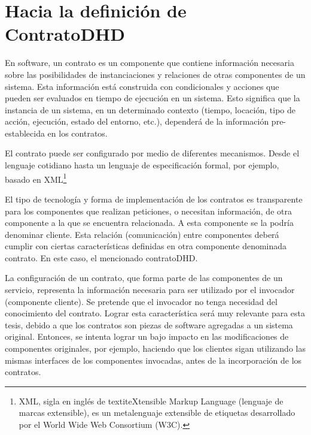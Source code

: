 \section {Hacia la definición de ContratoDHD}\label{sec:Hacia_la_definición_de_ContratosDHD}

En software, un contrato es un componente que contiene información necesaria sobre las posibilidades de  instanciaciones y relaciones de otras componentes de un sistema. Esta información está construida con condicionales y acciones que pueden ser evaluados en tiempo de ejecución en un sistema. Esto significa que la instancia de un sistema, en un determinado contexto (tiempo, locación, tipo de acción, ejecución, estado del entorno, etc.), dependerá de la información pre-establecida en los contratos. 


El contrato puede ser configurado por medio de diferentes mecanismos. Desde el lenguaje cotidiano hasta un lenguaje de especificación formal, por ejemplo, basado en XML\footnote {XML, sigla en inglés de textit{eXtensible Markup Language} (lenguaje de marcas extensible), es un metalenguaje extensible de etiquetas desarrollado por el World Wide Web Consortium (W3C).} 


El tipo de tecnología y forma de implementación de los contratos es transparente para los componentes que realizan peticiones, o necesitan información, de otra componente a la que se encuentra relacionada. A esta componente se la podría denominar cliente. Esta relación (comunicación) entre componentes deberá cumplir con ciertas características definidas en otra componente denominada contrato. En este caso, el mencionado contratoDHD.

La configuración de un contrato, que forma parte de las componentes de un servicio, representa la información necesaria  para ser utilizado por el invocador (componente cliente). Se pretende que el invocador no tenga necesidad del conocimiento del contrato. Lograr esta característica será muy relevante para esta tesis, debido a que los contratos son piezas de software agregadas a un sistema original. Entonces, se intenta lograr un bajo impacto en las modificaciones de componentes originales, por ejemplo, haciendo que los clientes sigan utilizando las mismas interfaces de los componentes invocadas, antes de la incorporación de los contratos. 

